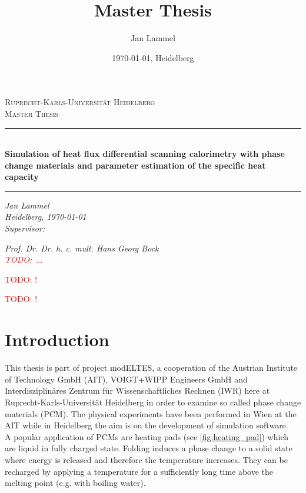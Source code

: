 \documentclass{scrartcl}[12pt, halfparskip]
\title{Master Thesis}
\author{Jan Lammel}
\date{\today{}, Heidelberg}
\numberwithin{equation}{section}
\numberwithin{figure}{section}
\numberwithin{table}{section}
\newcommand{\todo}[1]{\textcolor{red}{TODO: #1}}
\begin{document}
\begin{titlepage}
	\begin{center}
	
	\textsc{\large Ruprecht-Karls-Universit\"{a}t Heidelberg} \\[0.5cm]
	\textsc{\large Master Thesis}\\[1cm]
	
	\newcommand{\HRule}{\rule{\linewidth}{0.5mm}}
	\HRule \\[0.4cm]
	\huge \bfseries Simulation of heat flux differential scanning calorimetry with phase change materials and parameter estimation of the specific heat capacity 
	\HRule 
	
	\vspace{9cm}
	
	\Large \textit{Jan Lammel }\\
	\Large \textit{Heidelberg, \today }\\ \vspace{0.5cm}
	\Large \textit{Supervisor:}
	
	\Large \textit{Prof. Dr. Dr. h. c. mult. Hans Georg Bock}\\
	\Large \textit{\todo{...}}
	
	\end{center}
\end{titlepage}

\newpage

\tableofcontents 
\newpage





 \todo{!}
 
 
 \newpage

\todo{!}

\newpage






\section{Introduction}
This thesis is part of project modELTES, a cooperation of the Austrian Institute of Technology GmbH (AIT), VOIGT+WIPP Engineers GmbH and Interdisziplinäres Zentrum für Wissenschaftliches Rechnen (IWR) here at Ruprecht-Karls-Universität Heidelberg in order to examine so called phase change materials (PCM). The physical experiments have been performed in Wien at the AIT while in Heidelberg the aim is on the development of simulation software. \\
A popular application of PCMs are heating pads (see \cref{fig:heating_pad}) which are liquid in fully charged state. Folding induces a phase change to a solid state where energy is released and therefore the temperature increases. They can be recharged by applying a temperature for a sufficiently long time above the melting point (e.g. with boiling water). 
\end{document}
